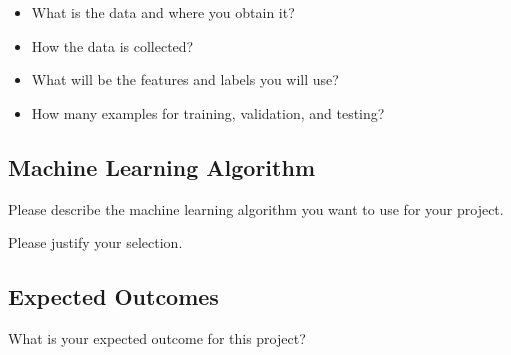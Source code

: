\documentclass[11pt]{article}
\begin{document}
\begin{itemize}
  \item What is the data and where you obtain it?
  \item How the data is collected?
  \item What will be the features and labels you will use?
  \item How many examples for training, validation, and testing?
\end{itemize}

\subsection{Machine Learning Algorithm}

Please describe the machine learning algorithm you want to use
for your project.

\noindent Please justify your selection.

\subsection{Expected Outcomes}

What is your expected outcome for this project?
\end{document}
